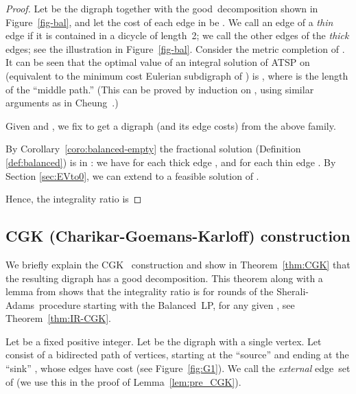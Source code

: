 \documentclass[11pt]{article}
\newcommand{\sa}{\textsf{Sherali-Adams}}
\begin{document}
\begin{proof}
Let  be the digraph together with the good~decomposition shown
in Figure~\ref{fig-bal}, and
let the cost of each edge in  be .
We call an edge of  a \emph{thin} edge if it is contained
in a dicycle of length~2;
we call the other edges of  the \emph{thick} edges;
see the illustration in Figure~\ref{fig-bal}.
Consider the metric completion  of .
It can be seen that the optimal value of
an integral solution of ATSP on 
(equivalent to the minimum cost Eulerian subdigraph of )
is ,
where  is the length of the ``middle path.''
(This can be proved by induction on , using similar arguments as
in Cheung~\cite[Claim~3~of~Theorem~11]{cheung05}.)

Given  and , we
fix  to get a digraph 
(and its edge costs) from the above family.

By Corollary~\ref{coro:balanced-empty}
the fractional solution 
(Definition \ref{def:balanced})
is in :
we have
 for each thick edge , and
 for each thin edge .
By Section \ref{sec:EVto0}, we can extend  to a
feasible solution of .

Hence, the integrality ratio is

\end{proof}






\subsection{CGK (Charikar-Goemans-Karloff) construction}

We briefly explain the CGK~\cite{CGK06} construction and show in
Theorem~\ref{thm:CGK} that the resulting digraph has a good
decomposition. This theorem along with a lemma from \cite{CGK06}
shows that the integrality ratio is 
for  rounds of the \sa\ procedure
starting with the Balanced~LP,
for any given , see Theorem~\ref{thm:IR-CGK}.


Let  be a fixed positive integer.
Let  be the digraph with a single vertex.
Let  consist of a bidirected path
of  vertices, starting at the ``source''  and ending
at the ``sink'' , whose  edges have cost  (see
Figure~\ref{fig:G1}).
We call  the \textit{external} edge~set of 
(we use this in the proof of Lemma~\ref{lem:pre_CGK}).
\end{document}
